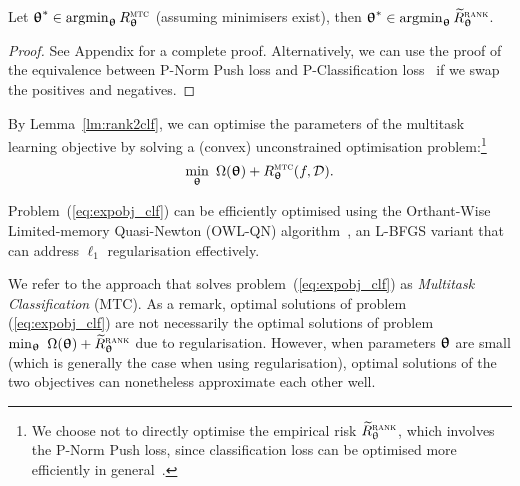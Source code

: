 \begin{lemma}
\label{lm:rank2clf}
Let ${\bm{\uptheta}}^* \in \operatorname*{argmin}_{{\bm{\uptheta}}} R_{{\bm{\uptheta}}}^{\textsc{mtc}}$ (assuming minimisers exist),
then ${\bm{\uptheta}}^* \in \operatorname*{argmin}_{{\bm{\uptheta}}} \widetilde R_{{\bm{\uptheta}}}^{\textsc{rank}}$.
\end{lemma}

\begin{proof}
See Appendix for a complete proof.
Alternatively, 
we can use the proof of the equivalence between P-Norm Push loss and P-Classification loss~\cite{ertekin2011equivalence}
if we swap the positives and negatives.
\end{proof}


By Lemma~\ref{lm:rank2clf}, %
we can optimise the parameters of the multitask learning objective by 
solving a (convex) unconstrained optimisation problem:\footnote{We choose not to directly optimise 
the empirical risk $\widetilde R_{\uptheta}^{\textsc{rank}}$, which involves the P-Norm Push loss, %
since classification loss can be optimised more efficiently in general~\cite{ertekin2011equivalence}.}
\begin{equation}
\label{eq:expobj_clf}
\min_{\bm{\uptheta}} \ \Omega({\bm{\uptheta}}) + R_{{\bm{\uptheta}}}^{\textsc{mtc}}(f, \mathcal{D}).
\end{equation}

Problem~(\ref{eq:expobj_clf}) can be efficiently optimised using the
Orthant-Wise Limited-memory Quasi-Newton (OWL-QN) algorithm~\cite{andrew2007scalable},
an L-BFGS variant that can address $\ell_1$ regularisation effectively.

We refer to the approach that solves problem~(\ref{eq:expobj_clf}) as \emph{Multitask Classification} (MTC). %
As a remark, optimal solutions of problem (\ref{eq:expobj_clf}) are not necessarily the optimal solutions 
of problem $\min_{\bm{\uptheta}} \ \Omega({\bm{\uptheta}}) + \widetilde R_{{\bm{\uptheta}}}^{\textsc{rank}}$ due to regularisation. %
However, when parameters ${\bm{\uptheta}}$ are small (which is generally the case when using regularisation),
optimal solutions of the two objectives can nonetheless approximate each other well.


